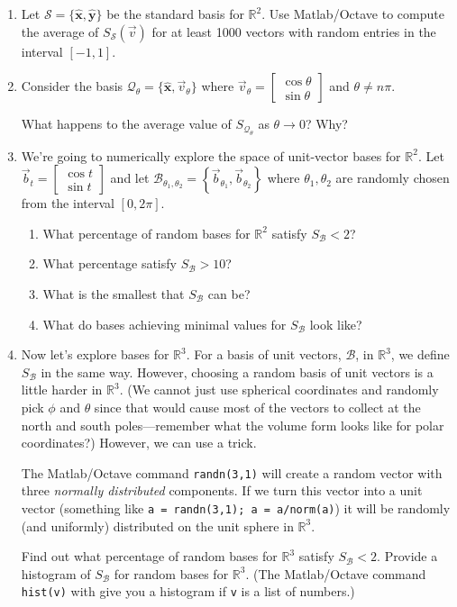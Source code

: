 \documentclass[letter]{article}
\newcommand{\R}{\mathbb{R}}
\newcommand{\mat}[1]{\begin{bmatrix}#1\end{bmatrix}}
\begin{document}
\begin{enumerate}
\begin{enumerate}
			\item Let $\mathcal S=\{\hat {\mathbf x},\hat {\mathbf y}\}$
				be the standard basis for $\R^2$.
				Use Matlab/Octave to compute the average of $S_{\mathcal S}(\vec v)$
				for at least 1000 vectors with random entries in the interval $[-1,1]$.

			\item Consider the basis $\mathcal Q_{\theta}=\{\hat {\mathbf x}, \vec v_{\theta}\}$
					where $\vec v_\theta = \mat{\cos\theta\\\sin\theta}$  and
					$\theta \neq n\pi$.

					What happens to the average value of $S_{\mathcal Q_{\theta}}$
					as $\theta\to 0$?  Why?

			\item We're going to numerically explore the space of unit-vector bases
				for $\R^2$.  Let $\vec b_t  = \mat{\cos t\\\sin t}$ and let
				$\mathcal B_{\theta_1,\theta_2}=\left\{\vec b_{\theta_1},\vec b_{\theta_2}\right\}$
				where $\theta_1,\theta_2$ are randomly chosen from the interval $[0,2\pi]$.

				\begin{enumerate}
					\item What percentage of random bases for $\R^2$ satisfy $S_{\mathcal B} < 2$?
					\item What percentage satisfy $S_{\mathcal B} > 10$?  
					\item What is the smallest
				that $S_{\mathcal B}$ can be?  
					\item What do bases achieving minimal values
				for $S_{\mathcal B}$ look like?
				\end{enumerate}

			\item Now let's explore bases for $\R^3$.  For a basis of unit vectors, $\mathcal B$, in
				$\R^3$, we define $S_{\mathcal B}$ in the same way.  However, choosing a
				random basis of unit vectors is a little harder in $\R^3$.  (We cannot just
				use spherical coordinates and randomly pick $\phi$ and $\theta$ since that
				would cause most of the vectors to collect at the north and south poles---remember
				what the volume form looks like for polar coordinates?)  However, we can use a trick.

				The Matlab/Octave command \texttt{randn(3,1)} will create a random vector
				with three \emph{normally distributed} components.  If we turn this vector
				into a unit vector (something like \texttt{a = randn(3,1); a = a/norm(a)})
				it will be randomly (and uniformly) distributed on the unit sphere in $\R^3$.

				Find out what percentage of random bases for $\R^3$ satisfy $S_{\mathcal B} < 2$.
				Provide a histogram of $S_{\mathcal B}$ for random bases for $\R^3$.  (The
				Matlab/Octave command \texttt{hist(v)} with give you a histogram if \texttt{v}
				is a list of numbers.)
			
		\end{enumerate}



	\end{enumerate}
\end{document}
